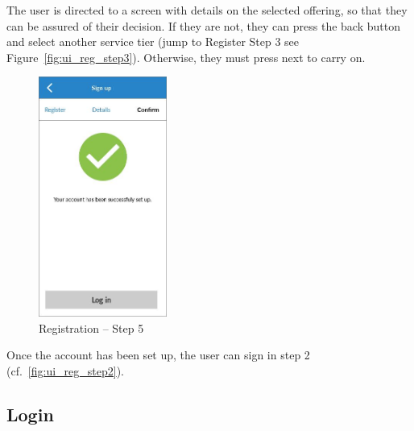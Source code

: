The user is directed to a screen with details on the selected offering, so that they can be assured of their decision. If they are not, they can press the back button and select another service tier (jump to Register Step 3 see Figure~\ref{fig:ui_reg_step3}). Otherwise, they must press next to carry on.

\begin{figure}
  \centering
  \begin{minipage}{4.6cm}
    \centering
    \includegraphics[width=4.2cm]{inc/ui_reg_step5.jpg}
    \caption{Registration -- Step 5}
    \label{fig:ui_step5}
  \end{minipage}
\end{figure}

\begin{minipage}{14cm}
  \centering
  \begin{minipage}{4.4cm}
    Once the account has been set up, the user can sign in step 2 (cf.~\ref{fig:ui_reg_step2}).
  \end{minipage}
\end{minipage}

\subsection{Login}

